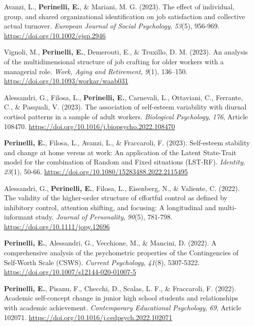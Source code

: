 \documentclass[hidelinks, letterpaper,10pt]{article} %
\begin{document}
\begin{etaremune}
\item Avanzi, L., \textbf{Perinelli, E.}, \& Mariani, M. G. (2023). The effect of individual, group, and shared organizational identification on job satisfaction and collective actual turnover. \textit{European Journal of Social Psychology}, \textit{53}(5), 956-969. \url{https://doi.org/10.1002/ejsp.2946}

\item Vignoli, M., \textbf{Perinelli, E.}, Demerouti, E., \& Truxillo, D. M. (2023). An analysis of the multidimensional structure of job crafting for older workers with a managerial role. \textit{Work, Aging and Retirement}, \textit{9}(1), 136–150. \url{https://doi.org/10.1093/workar/waab031} 

\item Alessandri, G., Filosa, L., \textbf{Perinelli, E.}, Carnevali, L., Ottaviani, C., Ferrante, C., \& Pasquali, V. (2023). The association of self-esteem variability with diurnal cortisol patterns in a sample of adult workers. \textit{Biological Psychology}, \textit{176}, Article 108470. \url{https://doi.org/10.1016/j.biopsycho.2022.108470}

\item \textbf{Perinelli, E.}, Filosa, L., Avanzi, L., \& Fraccaroli, F. (2023). Self-esteem stability and change at home versus at work: An application of the Latent State-Trait model for the combination of Random and Fixed situations (LST-RF). \textit{Identity}, \textit{23}(1), 50-66. \url{https://doi.org/10.1080/15283488.2022.2115495}

\item Alessandri, G., \textbf{Perinelli, E.}, Filosa, L., Eisenberg, N., \& Valiente, C. (2022). The validity of the higher‐order structure of effortful control as defined by inhibitory control, attention shifting, and focusing: A longitudinal and multi‐informant study. \textit{Journal of Personality}, \textit{90}(5), 781-798. \url{https://doi.org/10.1111/jopy.12696}

\item \textbf{Perinelli, E.}, Alessandri, G., Vecchione, M., \& Mancini, D. (2022). A comprehensive analysis of the psychometric properties of the Contingencies of Self-Worth Scale (CSWS). \textit{Current Psychology}, \textit{41}(8), 5307-5322. \url{https://doi.org/10.1007/s12144-020-01007-5} 

\item \textbf{Perinelli, E.}, Pisanu, F., Checchi, D., Scalas, L. F., \& Fraccaroli, F. (2022). Academic self-concept change in junior high school students and relationships with academic achievement. \textit{Contemporary Educational Psychology}, \textit{69}, Article 102071. \url{https://doi.org/10.1016/j.cedpsych.2022.102071}


\end{etaremune}
\end{document}
